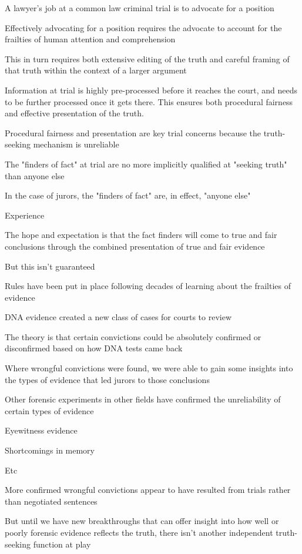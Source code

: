 A lawyer's job at a common law criminal trial is to advocate for a position

Effectively advocating for a position requires the advocate to account for the frailties of human attention and comprehension

This in turn requires both extensive editing of the truth and careful framing of that truth within the context of a larger argument

Information at trial is highly pre-processed before it reaches the court, and needs to be further processed once it gets there. This ensures both procedural fairness and effective presentation of the truth.

Procedural fairness and presentation are key trial concerns because the truth-seeking mechanism is unreliable

The "finders of fact" at trial are no more implicitly qualified at "seeking truth" than anyone else

In the case of jurors, the "finders of fact" are, in effect, "anyone else"

Experience

The hope and expectation is that the fact finders will come to true and fair conclusions through the combined presentation of true and fair evidence

But this isn't guaranteed

Rules have been put in place following decades of learning about the frailties of evidence

DNA evidence created a new class of cases for courts to review

The theory is that certain convictions could be absolutely confirmed or disconfirmed based on how DNA tests came back

Where wrongful convictions were found, we were able to gain some insights into the types of evidence that led jurors to those conclusions

Other forensic experiments in other fields have confirmed the unreliability of certain types of evidence

Eyewitness evidence

Shortcomings in memory

Etc

More confirmed wrongful convictions appear to have resulted from trials rather than negotiated sentences

But until we have new breakthroughs that can offer insight into how well or poorly forensic evidence reflects the truth, there isn't another independent truth-seeking function at play

